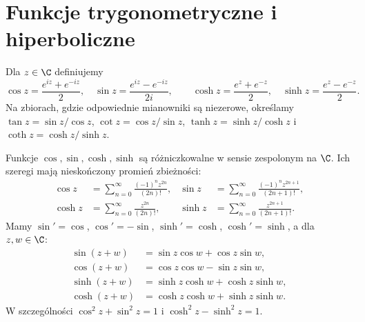 \section{Funkcje trygonometryczne i hiperboliczne}

\begin{definicja}
\label{ma2:def:complex-trig}
Dla $z\in\C$ definiujemy
\[
 \cos z=\frac{e^{iz}+e^{-iz}}2,\quad
 \sin z=\frac{e^{iz}-e^{-iz}}{2i},\qquad
 \cosh z=\frac{e^z+e^{-z}}2,\quad
 \sinh z=\frac{e^z-e^{-z}}2 .
\]
Na zbiorach, gdzie odpowiednie mianowniki są niezerowe, określamy
$\tan z=\sin z/\cos z$, $\cot z=\cos z/\sin z$,
$\tanh z=\sinh z/\cosh z$ i $\coth z=\cosh z/\sinh z$.
\end{definicja}

\begin{twierdzenie}
\label{ma2:thm:complex-trig-identities}
Funkcje $\cos,\sin,\cosh,\sinh$ są różniczkowalne w sensie
zespolonym na $\C$. Ich szeregi mają nieskończony promień zbieżności:
\begin{align*}
 \cos z&=\sum_{n=0}^\infty\frac{(-1)^nz^{2n}}{(2n)!},
 &\sin z&=\sum_{n=0}^\infty\frac{(-1)^nz^{2n+1}}{(2n+1)!},\\
 \cosh z&=\sum_{n=0}^\infty\frac{z^{2n}}{(2n)!},
 &\sinh z&=\sum_{n=0}^\infty\frac{z^{2n+1}}{(2n+1)!}.
\end{align*}
Mamy $\sin'=\cos$, $\cos'=-\sin$, $\sinh'=\cosh$, $\cosh'=\sinh$,
a dla $z,w\in\C$:
\begin{align*}
 \sin(z+w)&=\sin z\cos w+\cos z\sin w,\\
 \cos(z+w)&=\cos z\cos w-\sin z\sin w,\\
 \sinh(z+w)&=\sinh z\cosh w+\cosh z\sinh w,\\
 \cosh(z+w)&=\cosh z\cosh w+\sinh z\sinh w.
\end{align*}
W szczególności $\cos^2z+\sin^2z=1$ i $\cosh^2z-\sinh^2z=1$.
\end{twierdzenie}
